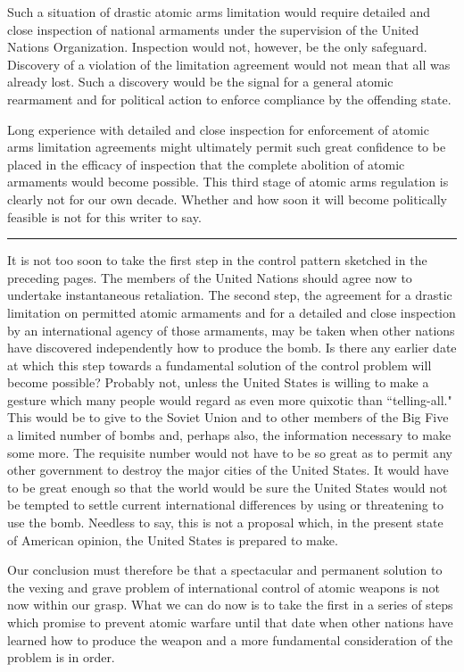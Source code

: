 Such a situation of drastic atomic arms limitation would require detailed and close inspection of national armaments under the supervision of the United Nations Organization. Inspection would not, however, be the only safeguard. Discovery of a violation of the limitation agreement would not mean that all was already lost. Such a discovery would be the signal for a general atomic rearmament and for political action to enforce compliance by the offending state.

Long experience with detailed and close inspection for enforcement of atomic arms limitation agreements might ultimately permit such great confidence to be placed in the efficacy of inspection that the complete abolition of atomic armaments would become possible. This third stage of atomic arms regulation is clearly not for our own decade. Whether and how soon it will become politically feasible is not for this writer to say.

\noindent\hfil\rule{0.4\textwidth}{.4pt}\hfil

\vspace{4pt}

It is not too soon to take the first step in the control pattern sketched in the preceding pages. The members of the United Nations should agree now to undertake instantaneous retaliation. The second step, the agreement for a drastic limitation on permitted atomic armaments and for a detailed and close inspection by an international agency of those armaments, may be taken when other nations have discovered independently how to produce the bomb. Is there any earlier date at which this step towards a fundamental solution of the control problem will become possible? Probably not, unless the United States is  willing to make a gesture which many people would regard as even more quixotic than ``telling-all." This would be to give to the Soviet Union and to other members of the Big Five a limited number of bombs and, perhaps also, the information necessary to make some more. The requisite number would not have to be so great as to permit any other government to destroy the major cities of the United States. It would have to be great enough so that the world would be sure the United States would not be tempted to settle current international differences by using or threatening to use the bomb. Needless to say, this is not a proposal which, in the present state of American opinion, the United States is prepared to make.

Our conclusion must therefore be that a spectacular and permanent solution to the vexing and grave problem of international control of atomic weapons is not now within our grasp. What we can do now is to take the first in a series of steps which promise to prevent atomic warfare until that date when other nations have learned how to produce the weapon and a more fundamental consideration of the problem is in order.
